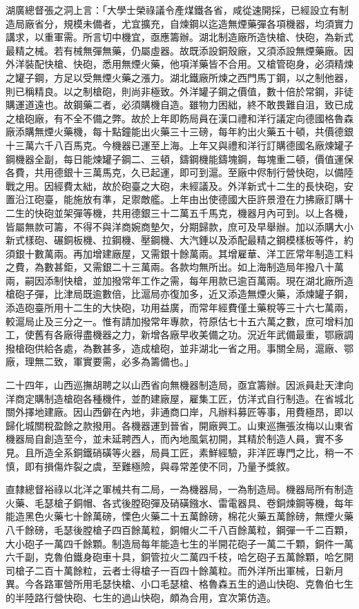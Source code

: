 \begin{pinyinscope}
湖廣總督張之洞上言：「大學士榮祿議令產煤鐵各省，咸從速開採，已經設立有制造局廠省分，規模未備者，尤宜擴充，自煉鋼以迄造無煙藥彈各項機器，均須實力講求，以重軍需。所言切中機宜，亟應籌辦。湖北制造廠所造快槍、快砲，為新式最精之械。若有械無彈無藥，仍屬虛器。故既添設銅殼廠，又須添設無煙藥廠。因外洋裝配快槍、快砲，悉用無煙火藥，他項洋藥皆不合用。又槍管砲身，必須精煉之罐子鋼，方足以受無煙火藥之漲力。湖北鐵廠所煉之西門馬丁鋼，以之制他器，則已稱精良。以之制槍砲，則尚非極致。外洋罐子鋼之價值，數十倍於常鋼，非徒購運道遠也。故鋼藥二者，必須購機自造。雖物力困絀，終不敢畏難自沮，致已成之槍砲廠，有不全不備之弊。故於上年即飭局員在漢口禮和洋行議定向德國格魯森廠添購無煙火藥機，每十點鐘能出火藥三十三磅，每年約出火藥五十頓，共價德銀十三萬六千八百馬克。今機器已運至上海。上年又與禮和洋行訂購德國名廠煉罐子鋼機器全副，每日能煉罐子鋼二、三頓，鑄鋼機能鑄塊鋼，每塊重二頓，價值運保各費，共用德銀十三萬馬克，久已起運，即可到滬。至廠中侭制行營快砲，以備陸戰之用。因經費太絀，故於砲臺之大砲，未經議及。外洋新式十二生的長快砲，安置沿江砲臺，能施放有準，足禦敵艦。上年由出使德國大臣許景澄在力拂廠訂購十二生的快砲並架彈等機，共用德銀三十二萬五千馬克，機器月內可到。以上各機，皆屬無款可籌，不得不與洋商婉商墊欠，分期歸款，庶可及早舉辦。加以添購大小新式樣砲、碾銅板機、拉鋼機、壓鋼機、大汽錘以及添配最精之鋼模樣板等件，約須銀十數萬兩。再加增建廠屋，又需銀十餘萬兩。其增雇華、洋工匠常年制造工料之費，為數甚鉅，又需銀二十三萬兩。各款均無所出。如上海制造局年撥八十萬兩，嗣因添制快槍，並加撥常年工作之需，每年用款已逾百萬兩。現在湖北廠所造槍砲子彈，比津局既逾數倍，比滬局亦復加多，近又添造無煙火藥，添煉罐子鋼，添造砲臺所用十二生的大快砲，功用益廣，而常年經費僅土藥稅等三十六七萬兩，較滬局止及三分之一。惟有請加撥常年專款，符原估七十五六萬之數，庶可增料加工，使舊有各廠得盡機器之力，新增各廠早收美備之功。況近年武備最重，鄂廠調撥槍砲供給各處，為數甚多，造成槍砲，並非湖北一省之用。事關全局，滬廠、鄂廠，理無二致，軍實要需，必多為籌備也。」

二十四年，山西巡撫胡聘之以山西省向無機器制造局，亟宜籌辦。因派員赴天津向洋商定購制造槍砲各種機件，並酌建廠屋，雇集工匠，仿洋式自行制造。在省城北關外擇地建廠。因山西僻在內地，非通商口岸，凡辦料募匠等事，用費極昂，即以歸化城關稅盈餘之款撥用。各機器運到晉省，開廠興工。山東巡撫張汝梅以山東省機器局自創造至今，並未延聘西人，而內地風氣初開，其精於制造人員，實不多見。且所造全系銅鐵硝磺等火器，局員工匠，素鮮經驗，非洋匠專門之比，稍一不慎，即有損傷炸裂之虞，至難極險，與尋常差使不同，乃量予獎敘。

直隸總督裕祿以北洋之軍械共有二局，一為機器局，一為制造局。機器局所有制造火藥、毛瑟槍子銅帽、各式後膛砲彈及硝磺鏹水、雷電器具、卷銅煉鋼等機，每年能造黑色火藥七十餘萬磅，慄色火藥二十五萬餘磅，棉花火藥五萬餘磅，無煙火藥八千餘磅，毛瑟後膛槍子四百餘萬粒，銅帽火二千八百餘萬粒，鋼彈一千二百顆，大小砲子一萬四千餘顆。制造局每年能造七生的半開花砲子一萬二千顆，銅件一萬六千副，克魯伯鐵身砲車十具，銅管拉火二萬四千枝，哈乞砲子五萬餘顆，哈乞開司槍子二百十萬餘粒，云者士得槍子一百四十餘萬粒。而外洋所出軍械，日新月異。今各路軍營所用毛瑟快槍、小口毛瑟槍、格魯森五生的過山快砲、克魯伯七生的半陸路行營快砲、七生的過山快砲，頗為合用，宜次第仿造。


\end{pinyinscope}
